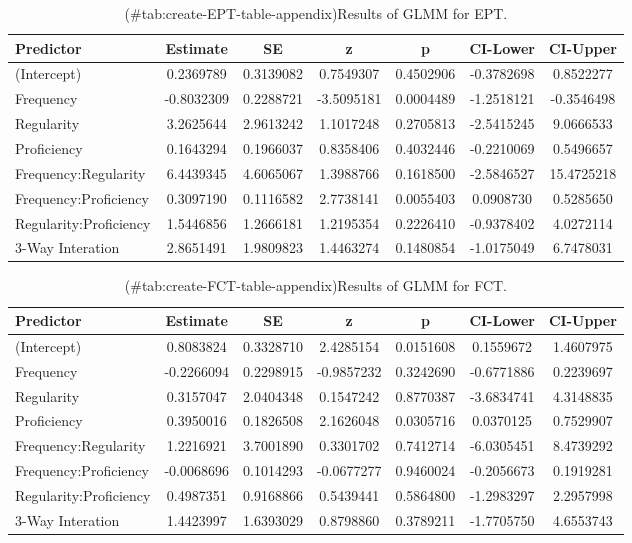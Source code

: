 \begin{appendix}
\begin{table}
\caption{(\#tab:create-EPT-table-appendix)Results of GLMM for EPT.}
\centering
\begin{tabular}[t]{l|c|c|c|c|c|c}
\hline
Predictor & Estimate & SE & z & p & CI-Lower & CI-Upper\\
\hline
(Intercept) & 0.2369789 & 0.3139082 & 0.7549307 & 0.4502906 & -0.3782698 & 0.8522277\\
\hline
Frequency & -0.8032309 & 0.2288721 & -3.5095181 & 0.0004489 & -1.2518121 & -0.3546498\\
\hline
Regularity & 3.2625644 & 2.9613242 & 1.1017248 & 0.2705813 & -2.5415245 & 9.0666533\\
\hline
Proficiency & 0.1643294 & 0.1966037 & 0.8358406 & 0.4032446 & -0.2210069 & 0.5496657\\
\hline
Frequency:Regularity & 6.4439345 & 4.6065067 & 1.3988766 & 0.1618500 & -2.5846527 & 15.4725218\\
\hline
Frequency:Proficiency & 0.3097190 & 0.1116582 & 2.7738141 & 0.0055403 & 0.0908730 & 0.5285650\\
\hline
Regularity:Proficiency & 1.5446856 & 1.2666181 & 1.2195354 & 0.2226410 & -0.9378402 & 4.0272114\\
\hline
3-Way Interation & 2.8651491 & 1.9809823 & 1.4463274 & 0.1480854 & -1.0175049 & 6.7478031\\
\hline
\end{tabular}
\end{table}

\begin{table}

\caption{(\#tab:create-FCT-table-appendix)Results of GLMM for FCT.}
\centering
\begin{tabular}[t]{l|c|c|c|c|c|c}
\hline
Predictor & Estimate & SE & z & p & CI-Lower & CI-Upper\\
\hline
(Intercept) & 0.8083824 & 0.3328710 & 2.4285154 & 0.0151608 & 0.1559672 & 1.4607975\\
\hline
Frequency & -0.2266094 & 0.2298915 & -0.9857232 & 0.3242690 & -0.6771886 & 0.2239697\\
\hline
Regularity & 0.3157047 & 2.0404348 & 0.1547242 & 0.8770387 & -3.6834741 & 4.3148835\\
\hline
Proficiency & 0.3950016 & 0.1826508 & 2.1626048 & 0.0305716 & 0.0370125 & 0.7529907\\
\hline
Frequency:Regularity & 1.2216921 & 3.7001890 & 0.3301702 & 0.7412714 & -6.0305451 & 8.4739292\\
\hline
Frequency:Proficiency & -0.0068696 & 0.1014293 & -0.0677277 & 0.9460024 & -0.2056673 & 0.1919281\\
\hline
Regularity:Proficiency & 0.4987351 & 0.9168866 & 0.5439441 & 0.5864800 & -1.2983297 & 2.2957998\\
\hline
3-Way Interation & 1.4423997 & 1.6393029 & 0.8798860 & 0.3789211 & -1.7705750 & 4.6553743\\
\hline
\end{tabular}
\end{table}
\end{appendix}
